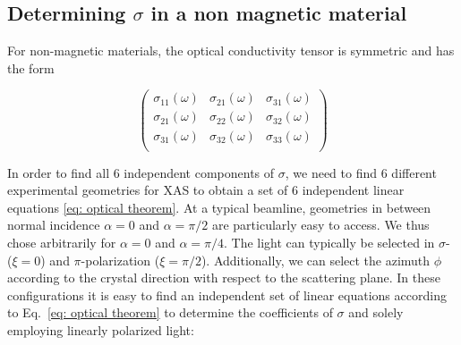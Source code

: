\documentclass[twocolumn,prb,twocolumn,amsmath,superscriptaddress,nofootinbib,amssymb]{revtex4-1}
\begin{document}
\begin{widetext}
\subsection{Determining $\sigma$ in a non magnetic material }

For non-magnetic materials, the optical conductivity tensor is symmetric and has the form

\begin{equation}
\left(
\begin{array}{ccc}
\sigma _{11}(\omega) & \sigma _{21}(\omega) & \sigma _{31}(\omega) \\
\sigma _{21}(\omega) & \sigma _{22}(\omega) & \sigma _{32}(\omega) \\
\sigma _{31}(\omega) & \sigma _{32}(\omega) & \sigma _{33}(\omega) \\
\end{array}
\right)
\end{equation}

In order to find all 6 independent components of $\sigma$, we need to find 6 different experimental geometries for XAS to obtain a set of 6 independent linear equations \ref{eq: optical theorem}. At a typical beamline, geometries in between normal incidence $\alpha=0$ and $\alpha=\pi/2$ are particularly easy to access. We thus chose arbitrarily for $\alpha=0$ and $\alpha=\pi/4$. The light can typically be selected in $\sigma$- ($\xi=0$) and $\pi$-polarization ($\xi=\pi/2$). Additionally, we can select the azimuth $\phi$ according to the crystal direction with respect to the scattering plane. In these configurations it is easy to find an independent set of linear equations according to Eq.~\ref{eq: optical theorem} to determine the coefficients of $\sigma$ and solely employing linearly polarized light:


\end{widetext}
\end{document}
